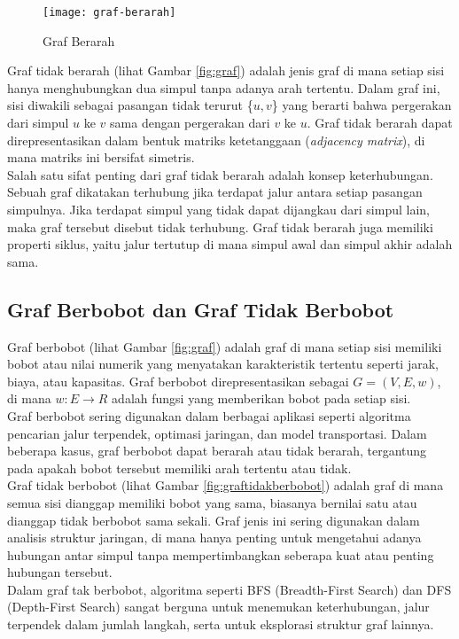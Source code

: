 \begin{figure}[H] 
    \centering  
    \texttt{[image: graf-berarah]}  
    \caption{Graf Berarah}
    \label{fig:grafberarah} 
\end{figure}
\newpage
\noindent
Graf tidak berarah (lihat Gambar \ref{fig:graf}) adalah jenis graf di mana setiap sisi hanya menghubungkan dua simpul tanpa adanya arah tertentu. Dalam graf ini, sisi diwakili sebagai pasangan tidak terurut \{$u,v$\} yang berarti bahwa pergerakan dari simpul $u$ ke $v$ sama dengan pergerakan dari $v$ ke $u$. Graf tidak berarah dapat direpresentasikan dalam bentuk matriks ketetanggaan (\textit{adjacency matrix}), di mana matriks ini bersifat simetris.
\\
Salah satu sifat penting dari graf tidak berarah adalah konsep keterhubungan. Sebuah graf dikatakan terhubung jika terdapat jalur antara setiap pasangan simpulnya. Jika terdapat simpul yang tidak dapat dijangkau dari simpul lain, maka graf tersebut disebut tidak terhubung. Graf tidak berarah juga memiliki properti siklus, yaitu jalur tertutup di mana simpul awal dan simpul akhir adalah sama.

\subsection{Graf Berbobot dan Graf Tidak Berbobot ~\cite{Diestel:17:graph}}
\label{sec:grafberbobot}
Graf berbobot (lihat Gambar \ref{fig:graf}) adalah graf di mana setiap sisi memiliki bobot atau nilai numerik yang menyatakan karakteristik tertentu seperti jarak, biaya, atau kapasitas. Graf berbobot direpresentasikan sebagai $G = (V,E,w)$, di mana $w:E\rightarrow R$ adalah fungsi yang memberikan bobot pada setiap sisi.
\\
Graf berbobot sering digunakan dalam berbagai aplikasi seperti algoritma pencarian jalur terpendek, optimasi jaringan, dan model transportasi. Dalam beberapa kasus, graf berbobot dapat berarah atau tidak berarah, tergantung pada apakah bobot tersebut memiliki arah tertentu atau tidak.
\\
Graf tidak berbobot (lihat Gambar \ref{fig:graftidakberbobot}) adalah graf di mana semua sisi dianggap memiliki bobot yang sama, biasanya bernilai satu atau dianggap tidak berbobot sama sekali. Graf jenis ini sering digunakan dalam analisis struktur jaringan, di mana hanya penting untuk mengetahui adanya hubungan antar simpul tanpa mempertimbangkan seberapa kuat atau penting hubungan tersebut.
\\
Dalam graf tak berbobot, algoritma seperti BFS (Breadth-First Search) dan DFS (Depth-First Search) sangat berguna untuk menemukan keterhubungan, jalur terpendek dalam jumlah langkah, serta untuk eksplorasi struktur graf lainnya.

